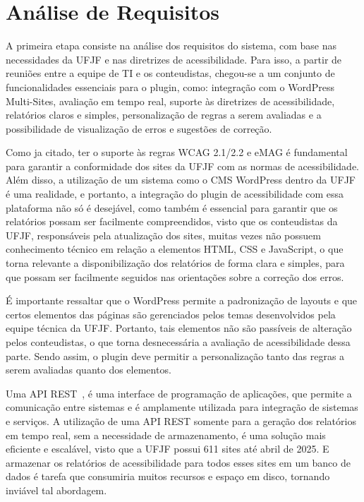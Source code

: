 \documentclass[
	article,			%
	12pt,				%
	oneside,			%
	a4paper,			%
	section=TITLE,		%
	subsection=TITLE,	%
	english,			%
	brazil,				%
	sumario=tradicional
	]{abntex2}
\begin{document}
\chapter*{Análise de Requisitos}
A primeira etapa consiste na análise dos requisitos do sistema, com base nas
necessidades da UFJF e nas diretrizes de acessibilidade. Para isso, a partir
de reuniões entre a equipe de TI e os conteudistas, chegou-se a um conjunto de
funcionalidades essenciais para o plugin, como: integração com o WordPress
Multi-Sites, avaliação em tempo real, suporte às diretrizes de acessibilidade,
relatórios claros e simples, personalização de regras a serem avaliadas e a
possibilidade de visualização de erros e sugestões de correção.

Como ja citado, ter o suporte às regras WCAG 2.1/2.2 e eMAG é fundamental para
garantir a conformidade dos sites da UFJF com as normas de acessibilidade.
Além disso, a utilização de um sistema como o CMS WordPress dentro da UFJF
é uma realidade, e portanto, a integração do plugin de acessibilidade com
essa plataforma não só é desejável, como também é essencial para garantir
que os relatórios possam ser facilmente compreendidos, visto que os
conteudistas da UFJF, responsáveis pela atualização dos sites, muitas
vezes não possuem conhecimento técnico em relação a elementos HTML,
CSS e JavaScript, o que torna relevante a disponibilização dos
relatórios de forma clara e simples, para que possam ser facilmente seguidos nas orientações sobre a
correção dos erros.

É importante ressaltar que o WordPress permite a padronização de layouts 
e que certos elementos das páginas são gerenciados pelos temas desenvolvidos pela 
equipe técnica da UFJF. Portanto, tais elementos não são passíveis de alteração
pelos conteudistas, o que torna desnecessária a avaliação de acessibilidade dessa parte. 
Sendo assim, o plugin deve permitir a
personalização tanto das regras a serem avaliadas quanto dos elementos.

Uma API REST~\cite{api}, é uma interface de programação de aplicações, que
permite a comunicação entre sistemas e é amplamente utilizada para integração
de sistemas e serviços. A utilização de uma API REST somente para a geração
dos relatórios em tempo real, sem a necessidade de armazenamento, é uma
solução mais eficiente e escalável, visto que a UFJF possui 
611 sites até abril de 2025. E armazenar os
relatórios de acessibilidade para todos esses sites em um banco de dados é tarefa que consumiria
muitos recursos e espaço em disco, tornando inviável tal abordagem.
\end{document}
